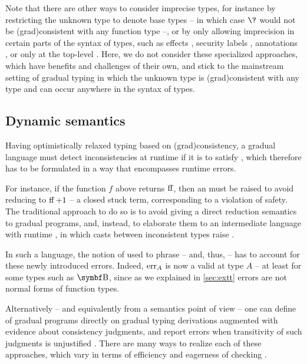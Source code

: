 Note that there are other ways to consider imprecise types, for instance by restricting the
unknown type to denote base types – in which case $\?$ would not be \kl(grad){consistent} with any
function type –, or by only allowing imprecision in certain parts of the syntax of types,
such as effects , security labels
, annotations ,
or only at the top-level .
Here, we do not consider these specialized approaches, which have benefits and challenges
of their own, and stick to the mainstream setting of gradual typing
in which the unknown type is \kl(grad){consistent} with any type and can occur
anywhere in the syntax of types.

\subsection{Dynamic semantics}

Having optimistically relaxed typing based on \kl(grad){consistency},
a gradual language must detect inconsistencies at runtime if it is to satisfy ,
which therefore has to be formulated in a way that encompasses runtime errors.

For instance, if the function $f$ above returns $\operatorname{ff}$,
then an  must be raised to avoid reducing to $\operatorname{ff} + 1$ – a closed stuck term,
corresponding to a violation of safety.
The traditional approach to do so is to avoid giving a direct reduction semantics to gradual
programs, and, instead, to elaborate them to an intermediate language with runtime ,
in which casts between inconsistent types raise %
.

In such a language, the notion of  used to phrase  – and,
thus,  – has to account for these newly introduced errors. Indeed, $\err[A]$
is now a valid  at type $A$ – at least for some types such as $\Bool$,
since as we explained in \cref{sec:extt}  errors are not normal forms of
function types.

Alternatively – and equivalently from a semantics point of view – one can define 
of gradual programs directly on gradual typing derivations augmented with evidence about
consistency judgments, and report errors when transitivity of such judgments is
unjustified .
There are many ways to realize each of these approaches,
which vary in terms of efficiency and eagerness of checking .


